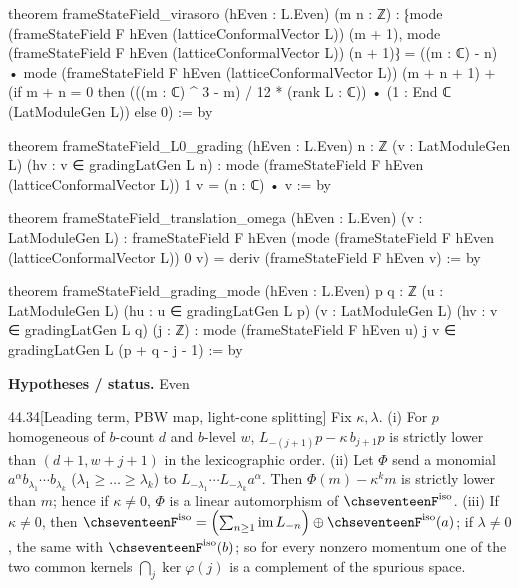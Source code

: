 \documentclass[11pt,openany]{book}
\theoremstyle{definition}
\theoremstyle{plain}
\begin{document}
\begin{leancode}
theorem frameStateField_virasoro (hEven : L.Even)  (m n : ℤ) :
    ⁅mode (frameStateField F hEven (latticeConformalVector L)) (m + 1),
      mode (frameStateField F hEven (latticeConformalVector L)) (n + 1)⁆
      = ((m : ℂ) - n) • mode (frameStateField F hEven (latticeConformalVector L)) (m + n + 1)
        + (if m + n = 0 then (((m : ℂ) ^ 3 - m) / 12 * (rank L : ℂ)) • (1 : End ℂ (LatModuleGen L))
           else 0) := by

theorem frameStateField_L0_grading (hEven : L.Even)  {n : ℤ} (v : LatModuleGen L)
    (hv : v ∈ gradingLatGen L n) :
    mode (frameStateField F hEven (latticeConformalVector L)) 1 v = (n : ℂ) • v := by

theorem frameStateField_translation_omega (hEven : L.Even)  (v : LatModuleGen L) :
    frameStateField F hEven (mode (frameStateField F hEven (latticeConformalVector L)) 0 v)
      = deriv (frameStateField F hEven v) := by

theorem frameStateField_grading_mode (hEven : L.Even)  {p q : ℤ} (u : LatModuleGen L)
    (hu : u ∈ gradingLatGen L p) (v : LatModuleGen L) (hv : v ∈ gradingLatGen L q) (j : ℤ) :
    mode (frameStateField F hEven u) j v ∈ gradingLatGen L (p + q - j - 1) := by
\end{leancode}
\noindent\textbf{Hypotheses / status.} Even\par
\medskip
\begin{btheorem}{44.34}[Leading term, PBW map, light-cone splitting]
Fix $\kappa,\lambda$.  (i) For $p$ homogeneous of $b$-count $d$ and $b$-level $w$,
$L_{-(j+1)}p-\kappa\,b_{j+1}p$ is strictly lower than $(d+1,w+j+1)$ in the lexicographic order.
(ii) Let $\Phi$ send a monomial $a^\alpha b_{\lambda_1}\cdots b_{\lambda_k}$ ($\lambda_1\ge\dots\ge\lambda_k$) to
$L_{-\lambda_1}\cdots L_{-\lambda_k}a^\alpha$.  Then $\Phi(m)-\kappa^km$ is strictly lower than $m$; hence if $\kappa\ne0$,
$\Phi$ is a linear automorphism of $\chseventeenF^{\mathrm{iso}}$.
(iii) If $\kappa\ne0$, then $\chseventeenF^{\mathrm{iso}}=\Bigl(\sum_{n\ge1}\operatorname{im}L_{-n}\Bigr)\oplus\chseventeenF^{\mathrm{iso}}(a)$; if $\lambda\ne0$,
the same with $\chseventeenF^{\mathrm{iso}}(b)$; so for every nonzero momentum one of the two common kernels
$\bigcap_j\ker \varphi(j)$ is a complement of the spurious space.
\end{btheorem}
\end{document}
